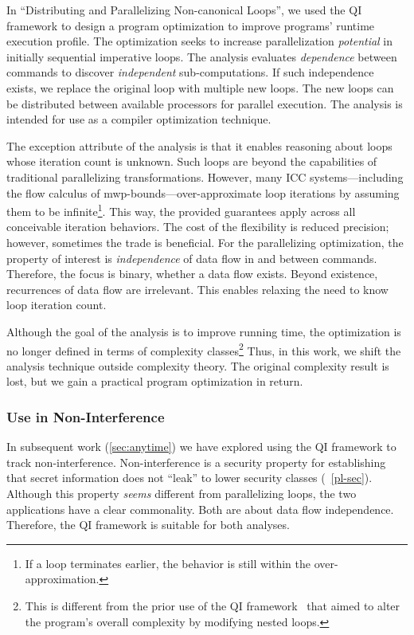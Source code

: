 In \enquote{Distributing and Parallelizing Non-canonical Loops},
we used the QI framework to design a program optimization to improve programs' runtime execution profile.
The optimization seeks to increase parallelization \emph{potential} in initially sequential imperative loops.
The analysis evaluates \emph{dependence} between commands to discover \emph{independent} sub-computations.
If such independence exists, we replace the original loop with multiple new loops.
The new loops can be distributed between available processors for parallel execution.
The analysis is intended for use as a compiler optimization technique.

The exception attribute of the analysis is that it enables reasoning about
loops whose iteration count is unknown.
Such loops are beyond the capabilities of traditional parallelizing transformations.
However, many ICC systems---including the flow calculus of mwp-bounds---over-approximate loop iterations by assuming them to be infinite\footnote{If a loop terminates earlier, the behavior is still within the over-approximation.}.
This way, the provided guarantees apply across all conceivable iteration behaviors.
The cost of the flexibility is reduced precision;
however, sometimes the trade is beneficial.
For the parallelizing optimization, the property of interest is \emph{independence} of data flow in and between commands.
Therefore, the focus is binary, \ie whether a data flow exists.
Beyond existence, recurrences of data flow are irrelevant.
This enables relaxing the need to know loop iteration count.

Although the goal of the analysis is to improve running time,
the optimization is no longer defined in terms of complexity classes\footnote{
This is different from the prior use of the QI framework~\cite{moyen20172}
that aimed to alter the program's overall complexity by modifying nested loops.}
Thus, in this work, we shift the analysis technique outside complexity theory.
The original complexity result is lost, but we gain a practical program optimization in return.

\subsubsection{Use in Non-Interference}
\label{subsubsec:qi-ni}

In subsequent work (\autoref{sec:anytime}) we have explored
using the QI framework to track non-interference.
Non-interference is a security property for establishing that secret information does not \enquote{leak} to lower security classes (\cf~\autoref{pl-sec}).
Although this property \emph{seems} different from parallelizing loops,
the two applications have a clear commonality.
Both are about data flow independence.
Therefore, the QI framework is suitable for both analyses.

